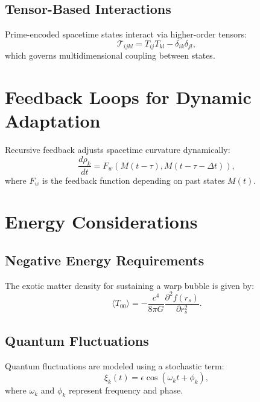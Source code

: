 \documentclass{article}
\theoremstyle{plain}
\begin{document}
\subsection{Tensor-Based Interactions}
Prime-encoded spacetime states interact via higher-order tensors:
\begin{equation}
    \mathcal{T}_{ijkl} = T_{ij}T_{kl} - \delta_{ik}\delta_{jl},
\end{equation}
which governs multidimensional coupling between states.

\section{Feedback Loops for Dynamic Adaptation}
Recursive feedback adjusts spacetime curvature dynamically:
\begin{equation}
    \frac{d\rho_k}{dt} = F_w\left(M(t-\tau), M(t-\tau-\Delta t)\right),
\end{equation}
where $F_w$ is the feedback function depending on past states $M(t)$.

\section{Energy Considerations}

\subsection{Negative Energy Requirements}
The exotic matter density for sustaining a warp bubble is given by:
\begin{equation}
    \langle T_{00} \rangle = -\frac{c^4}{8\pi G} \frac{\partial^2 f(r_s)}{\partial r_s^2}.
\end{equation}

\subsection{Quantum Fluctuations}
Quantum fluctuations are modeled using a stochastic term:
\begin{equation}
    \xi_k(t) = \epsilon \cos(\omega_k t + \phi_k),
\end{equation}
where $\omega_k$ and $\phi_k$ represent frequency and phase.
\end{document}
